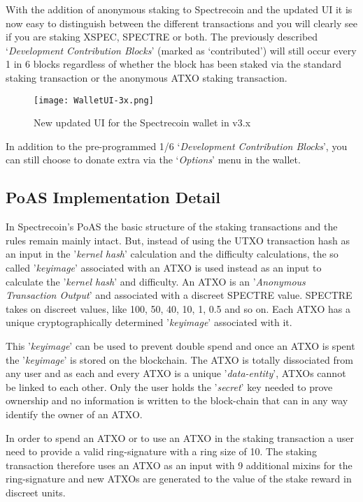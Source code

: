 With the addition of anonymous staking to Spectrecoin and the updated UI it
is now easy to distinguish between the different transactions and you will
clearly see if you are staking XSPEC, SPECTRE or both. The previously
described ‘\textit{Development Contribution Blocks}’ (marked as ‘contributed’)
will still occur every 1 in 6 blocks regardless of whether the block has
been staked via the standard staking transaction or the anonymous ATXO
staking transaction.



\begin{figure}[ht]
	\caption{New updated UI for the Spectrecoin wallet in v3.x}
	\centering
	\texttt{[image: WalletUI-3x.png]}
\end{figure}



In addition to the pre-programmed 1/6 ‘\textit{Development Contribution Blocks}’,
you can still choose to donate extra via the ‘\textit{Options}’ menu in the wallet.



\subsection{PoAS Implementation Detail}
In Spectrecoin's PoAS the basic structure of the staking transactions and
the rules remain mainly intact. But, instead of using the UTXO transaction
hash as an input in the '\textit{kernel hash}' calculation and the
difficulty calculations, the so called '\textit{keyimage}' associated with
an ATXO is used instead as an input to calculate the '\textit{kernel hash}'
and difficulty. An ATXO is an '\textit{Anonymous Transaction Output}' and
associated with a discreet SPECTRE value. SPECTRE takes on discreet values,
like 100, 50, 40, 10, 1, 0.5 and so on. Each ATXO has a unique
cryptographically determined '\textit{keyimage}' associated with it.



This '\textit{keyimage}' can be used to prevent double spend and once an
ATXO is spent the '\textit{keyimage}' is stored on the blockchain. The ATXO
is totally dissociated from any user and as each and every ATXO is a unique
'\textit{data-entity}', ATXOs cannot be linked to each other. Only the user
holds the '\textit{secret}' key needed to prove ownership and no information
is written to the block-chain that can in any way identify the owner of an
ATXO.



In order to spend an ATXO or to use an ATXO in the staking transaction a user
need to provide a valid ring-signature with a ring size of 10. The staking
transaction therefore uses an ATXO as an input with 9 additional mixins for
the ring-signature and new ATXOs are generated to the value of the stake
reward in discreet units.



